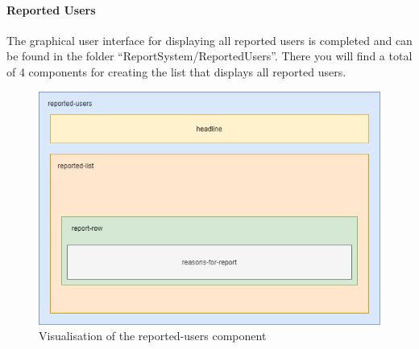 \paragraph{Reported Users}
The graphical user interface for displaying all reported users is completed and can be found in the folder \enquote{ReportSystem/ReportedUsers}.
There you will find a total of 4 components for creating the list that displays all reported users.
\\
\begin{figure}[h]
    \centering
    \includegraphics[width=1.0\textwidth]{./images/report_component}
    \caption{Visualisation of the reported-users component}
    \label{fig:reportedusers}
\end{figure}
\\
